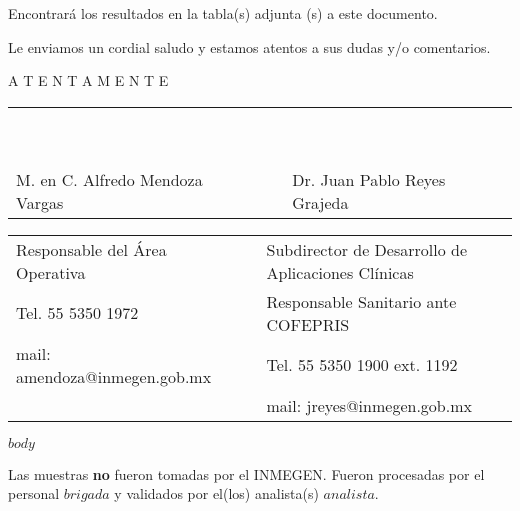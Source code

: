 \documentclass[$if(fontsize)$$fontsize$,$endif$$if(papersize)$$papersize$,$endif$$for(classoption)$$classoption$$sep$,$endfor$table]{article}
\begin{document}
\medskip

Encontrará los resultados en la tabla(s) adjunta (s) a este documento.\\

\smallskip

Le enviamos un cordial saludo y estamos atentos a sus dudas y/o comentarios.\\

\medskip

\vspace*{\fill}
\begin{center}
A T E N T A M E N T E
\end{center}

\vspace{2cm}
\begin{center}
\begin{tabular}{m{8cm} p{1cm} m{8cm}}
~ & ~ & ~ \\
~ & ~ & ~ \\
\cmidrule(r){1-1}\cmidrule(l){3-3}
M. en C. Alfredo Mendoza Vargas & ~ & Dr. Juan Pablo Reyes Grajeda \\
\end{tabular}

\footnotesize
\begin{tabular}{m{8cm} p{1cm} m{8cm}}
Responsable del Área Operativa & ~ & Subdirector de Desarrollo de Aplicaciones Clínicas\\
Tel. 55 5350 1972 & ~ & Responsable Sanitario ante COFEPRIS\\
mail: amendoza@inmegen.gob.mx & ~ & Tel. 55 5350 1900 ext. 1192\\
~ & ~ & mail: jreyes@inmegen.gob.mx \\
\end{tabular}
\end{center}

\clearpage

$body$


\vspace*{\fill}
{\footnotesize Las muestras \textbf{no} fueron tomadas por el INMEGEN. Fueron procesadas por el personal $brigada$ y validados por el(los) analista(s) $analista$. \par}
\end{document}
